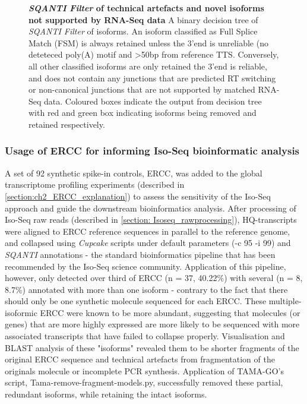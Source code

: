 \begin{figure}[!h]
	{\textbf{\textit{SQANTI Filter} of technical artefacts and novel isoforms not supported by RNA-Seq data} A binary decision tree of \textit{SQANTI Filter} of isoforms. An isoform classified as Full Splice Match (FSM) is always retained unless the 3'end is unreliable (no deteteced poly(A) motif and >50bp from reference TTS. Conversely, all other classified isoforms are only retained the 3'end is reliable, and does not contain any junctions that are predicted RT switching or non-canonical junctions that are not supported by matched RNA-Seq data. Coloured boxes indicate the output from decision tree with red and green box indicating isoforms being removed and retained respectively.}
	\label{fig:sqantifiltering}
\end{figure}



\subsubsection{Usage of ERCC for informing Iso-Seq bioinformatic analysis}
A set of 92 synthetic spike-in controls, ERCC, was added to the global transcriptome profiling experiments (described in \cref{section:ch2_ERCC_explanation}) to assess the sensitivity of the Iso-Seq approach and guide the downstream bioinformatics analysis. After processing of Iso-Seq raw reads (described in \cref{section: Isoseq_rawprocessing}), HQ-transcripts were aligned to ERCC reference sequences in parallel to the reference genome, and collapsed using \textit{Cupcake} scripts under default parameters (-c 95 -i 99) and \textit{SQANTI} annotations - the standard bioinformatics pipeline that has been recommended by the Iso-Seq science community. Application of this pipeline, however, only detected over third of ERCC (n = 37, 40.22\%) with several (n = 8, 8.7\%) annotated with more than one isoform - contrary to the fact that there should only be one synthetic molecule sequenced for each ERCC. These multiple-isoformic ERCC were known to be more abundant, suggesting that molecules (or genes) that are more highly expressed are more likely to be sequenced with more associated transcripts that have failed to collapse properly. Visualisation and BLAST analysis of these "isoforms" revealed them to be shorter fragments of the original ERCC sequence and technical artefacts from fragmentation of the originals molecule or incomplete PCR synthesis. Application of TAMA-GO's script, Tama-remove-fragment-models.py, successfully removed these partial, redundant isoforms, while retaining the intact isoforms. 

